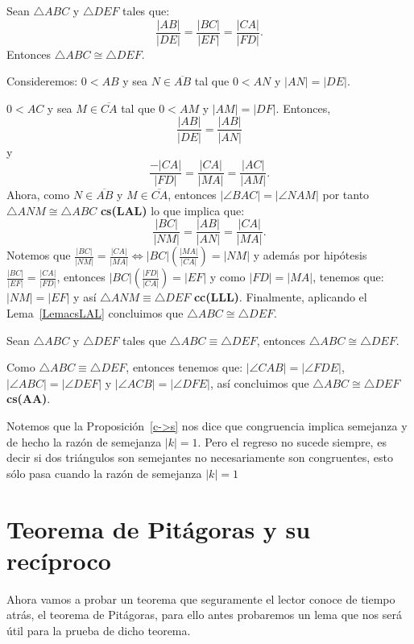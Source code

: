 \begin{teo}
Sean $\triangle ABC$ y $\triangle DEF$ tales que: 
$$\frac{|AB|}{|DE|}=\frac{|BC|}{|EF|}=\frac{|CA|}{|FD|}.$$ 
Entonces $\triangle ABC \cong \triangle DEF.$
\end{teo}
\begin{dem}
Consideremos:
$0<AB$ y sea $N \in \overline{AB}$ tal que $0<AN$ y $|AN|=|DE|$.
	
$0<AC$ y sea $M \in \overline{CA}$ tal que $0<AM$ y $|AM|=|DF|$.
Entonces, 
$$\frac{|AB|}{|DE|}=\frac{|AB|}{|AN|}$$ y
$$\frac{-|CA|}{|FD|}=\frac{|CA|}{|MA|}=\frac{|AC|}{|AM|}.$$	
Ahora, como $N \in \overline{AB}$ y $M \in \overline{CA}$, entonces $|\angle BAC|=|\angle NAM|$ por tanto $\triangle ANM \cong \triangle ABC$ \textbf{cs(LAL)} lo que implica que:
$$\frac{|BC|}{|NM|}=\frac{|AB|}{|AN|}=\frac{|CA|}{|MA|}.$$
Notemos que $\frac{|BC|}{|NM|}=\frac{|CA|}{|MA|}\Leftrightarrow |BC|\left(\frac{|MA|}{|CA|}\right)=|NM|$ y además por hipótesis 
$\frac{|BC|}{|EF|}=\frac{|CA|}{|FD|}$, entonces $|BC|\left(\frac{|FD|}{|CA|}\right)=|EF|$ y como $|FD|=|MA|$, tenemos que: $|NM|=|EF|$ y así $\triangle ANM \equiv \triangle DEF$ \textbf{cc(LLL)}. 
Finalmente, aplicando el Lema~\ref{LemacsLAL} concluimos que $\triangle ABC \cong \triangle DEF.$
\end{dem}


\begin{prop}\label{c->s}
Sean $\triangle ABC$ y $\triangle DEF$ tales que $\triangle ABC \equiv \triangle DEF$, entonces $\triangle ABC \cong \triangle DEF.$
\end{prop}
\begin{pba}
Como $\triangle ABC \equiv \triangle DEF$, entonces tenemos que:
$|\angle CAB|=|\angle FDE|$, $|\angle ABC|=|\angle DEF|$ y $|\angle ACB|=|\angle DFE|$, así concluimos que $\triangle ABC \cong \triangle DEF$ \textbf{cs(AA)}.
\end{pba}	

\begin{obs} 
Notemos que la Proposición~\ref{c->s} nos dice que congruencia implica semejanza y de hecho la razón de semejanza $|k|=1$. Pero el regreso no sucede siempre, es decir si dos triángulos son semejantes no necesariamente son congruentes, esto sólo pasa cuando la razón de semejanza $|k|=1$
\end{obs}
	
\section{Teorema de Pitágoras y su recíproco}
Ahora vamos a probar un teorema que seguramente el lector conoce de tiempo atrás, el teorema de Pitágoras, para ello antes probaremos un lema que nos será útil para la prueba de dicho teorema.

